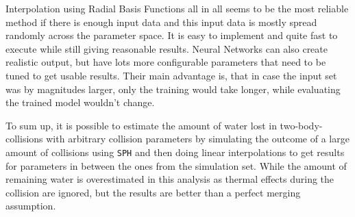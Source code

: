 Interpolation using Radial Basis Functions all in all seems to be the most reliable method if there is enough input data and this input data is mostly spread randomly across the parameter space. It is easy to implement and quite fast to execute while still giving reasonable results. Neural Networks can also create realistic output, but have lots more configurable parameters that need to be tuned to get usable results. Their main advantage is, that in case the input set was by magnitudes larger, only the training would take longer, while evaluating the trained model wouldn't change.

To sum up, it is possible to estimate the amount of water lost in two-body-collisions with arbitrary collision parameters by simulating the outcome of a large amount of collisions using \texttt{SPH} and then doing linear interpolations to get results for parameters in between the ones from the simulation set. While the amount of remaining water is overestimated in this analysis as thermal effects during the collision are ignored, but the results are better than a perfect merging assumption.

